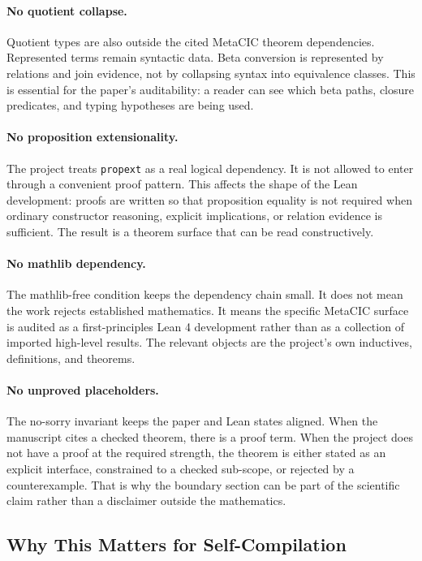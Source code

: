 \paragraph{No quotient collapse.}
Quotient types are also outside the cited MetaCIC theorem dependencies.
Represented terms remain syntactic data.  Beta conversion is represented by
relations and join evidence, not by collapsing syntax into equivalence
classes.  This is essential for the paper's auditability: a reader can see
which beta paths, closure predicates, and typing hypotheses are being used.

\paragraph{No proposition extensionality.}
The project treats \texttt{propext} as a real logical dependency.  It is not
allowed to enter through a convenient proof pattern.  This affects the shape
of the Lean development: proofs are written so that proposition equality is
not required when ordinary constructor reasoning, explicit implications, or
relation evidence is sufficient.  The result is a theorem surface that can be
read constructively.

\paragraph{No mathlib dependency.}
The mathlib-free condition keeps the dependency chain small.  It does not
mean the work rejects established mathematics.  It means the specific
MetaCIC surface is audited as a first-principles Lean 4 development rather
than as a collection of imported high-level results.  The relevant objects
are the project's own inductives, definitions, and theorems.

\paragraph{No unproved placeholders.}
The no-sorry invariant keeps the paper and Lean states aligned.  When the
manuscript cites a checked theorem, there is a proof term.  When the project
does not have a proof at the required strength, the theorem is either stated
as an explicit interface, constrained to a checked sub-scope, or rejected by a
counterexample.  That is why the boundary section can be part of the
scientific claim rather than a disclaimer outside the mathematics.

\subsection{Why This Matters for Self-Compilation}
\label{subsec:metacic-boundary-self-compilation}

